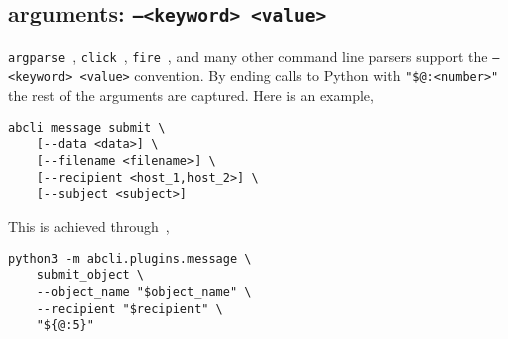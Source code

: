 \subsection{arguments: \texttt{--<keyword> <value>}}\label{expansions_param_injection}

\texttt{argparse}~\cite{argparse}, \texttt{click}~\cite{click}, \texttt{fire}~\cite{python_fire}, and many other command line parsers support the \texttt{--<keyword> <value>} convention. By ending calls to Python with \texttt{"\${@:<number>}"} the rest of the arguments are captured. Here is an example,
%
\begin{verbatim}
abcli message submit \
    [--data <data>] \
    [--filename <filename>] \
    [--recipient <host_1,host_2>] \
    [--subject <subject>]
\end{verbatim}
%
This is achieved through~,
%
\begin{verbatim}
python3 -m abcli.plugins.message \
    submit_object \
    --object_name "$object_name" \
    --recipient "$recipient" \
    "${@:5}"
\end{verbatim}